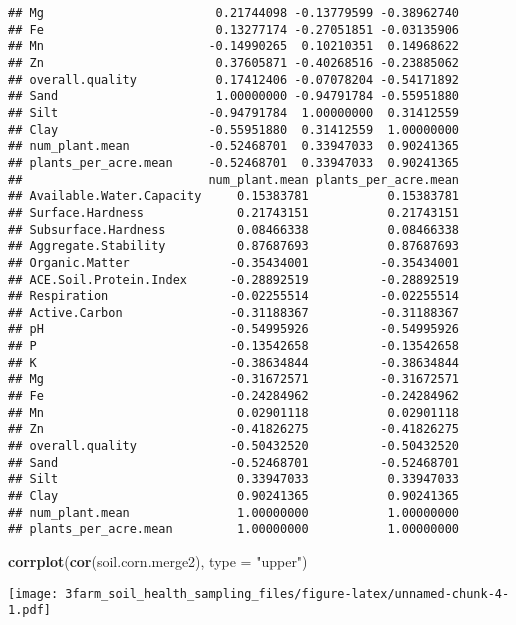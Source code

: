 \documentclass[]{article}
\newenvironment{Shaded}{\begin{snugshade}}{\end{snugshade}}
\newcommand{\KeywordTok}[1]{\textcolor[rgb]{0.13,0.29,0.53}{\textbf{#1}}}
\newcommand{\DataTypeTok}[1]{\textcolor[rgb]{0.13,0.29,0.53}{#1}}
\newcommand{\StringTok}[1]{\textcolor[rgb]{0.31,0.60,0.02}{#1}}
\newcommand{\NormalTok}[1]{#1}
\begin{document}
\begin{verbatim}
## Mg                        0.21744098 -0.13779599 -0.38962740
## Fe                        0.13277174 -0.27051851 -0.03135906
## Mn                       -0.14990265  0.10210351  0.14968622
## Zn                        0.37605871 -0.40268516 -0.23885062
## overall.quality           0.17412406 -0.07078204 -0.54171892
## Sand                      1.00000000 -0.94791784 -0.55951880
## Silt                     -0.94791784  1.00000000  0.31412559
## Clay                     -0.55951880  0.31412559  1.00000000
## num_plant.mean           -0.52468701  0.33947033  0.90241365
## plants_per_acre.mean     -0.52468701  0.33947033  0.90241365
##                          num_plant.mean plants_per_acre.mean
## Available.Water.Capacity     0.15383781           0.15383781
## Surface.Hardness             0.21743151           0.21743151
## Subsurface.Hardness          0.08466338           0.08466338
## Aggregate.Stability          0.87687693           0.87687693
## Organic.Matter              -0.35434001          -0.35434001
## ACE.Soil.Protein.Index      -0.28892519          -0.28892519
## Respiration                 -0.02255514          -0.02255514
## Active.Carbon               -0.31188367          -0.31188367
## pH                          -0.54995926          -0.54995926
## P                           -0.13542658          -0.13542658
## K                           -0.38634844          -0.38634844
## Mg                          -0.31672571          -0.31672571
## Fe                          -0.24284962          -0.24284962
## Mn                           0.02901118           0.02901118
## Zn                          -0.41826275          -0.41826275
## overall.quality             -0.50432520          -0.50432520
## Sand                        -0.52468701          -0.52468701
## Silt                         0.33947033           0.33947033
## Clay                         0.90241365           0.90241365
## num_plant.mean               1.00000000           1.00000000
## plants_per_acre.mean         1.00000000           1.00000000
\end{verbatim}

\begin{Shaded}
\begin{Highlighting}[]
\KeywordTok{corrplot}\NormalTok{(}\KeywordTok{cor}\NormalTok{(soil.corn.merge2), }\DataTypeTok{type =} \StringTok{"upper"}\NormalTok{)}
\end{Highlighting}
\end{Shaded}

\texttt{[image: 3farm\_soil\_health\_sampling\_files/figure-latex/unnamed-chunk-4-1.pdf]}
\end{document}
